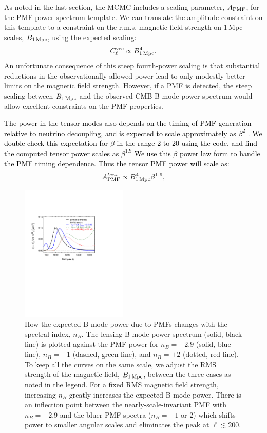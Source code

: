 \documentclass[apj]{emulateapj}
\newcommand{\apmf}{\ensuremath{A_{\rm PMF}}}
\newcommand{\bpmf}{\ensuremath{B_{\rm 1\,Mpc}}}
\newcommand{\be}{\begin{equation}}
\newcommand{\ee}{\end{equation}}
\newcommand{\changed}[1]{\textcolor{Black}{#1}}
\begin{document}
As noted in the last section, the MCMC includes a  scaling parameter, \apmf{}, for the PMF power spectrum template. 
We can translate the amplitude constraint on this template to a constraint on the r.m.s. magnetic field strength on 1\,Mpc scales, \bpmf, using the expected scaling:
\be \label{eqn:scaling}
C_{\ell}^{\rm{vec}} \propto \bpmf^4.
\ee
An unfortunate consequence of this steep fourth-power scaling is that substantial reductions in the observationally allowed power lead to only modestly better limits on the magnetic field strength. 
However, if a PMF is detected, the steep scaling between \bpmf{} and the observed CMB B-mode power spectrum would allow excellent constraints on the PMF properties.

\changed{The power in the tensor modes also depends on the timing of PMF generation relative to neutrino decoupling, and is expected to scale approximately as $\beta^2$ \citep{lewis04,shaw10b}.   
We double-check this expectation for $\beta$ in the range 2 to 20 using the  \citet{zucca16} code, and find the computed tensor power scales as $\beta^{1.9}$
We use this $\beta$ power law form to handle the PMF timing dependence. 
Thus the tensor PMF power will scale as:
\be \label{eqn:betascaling}
\apmf^{tens} \propto  \bpmf^4 \beta^{1.9},
\ee
}

\begin{figure}[htb]\centering
\includegraphics[width=0.45\textwidth,clip,trim={1.5cm 12.cm 5.5cm 4cm}]{pmf_templates_nb.pdf}
  \caption[CMB polarization from PMFs with different spectral indices]{ \label{fig:pmf-nb}
  How the expected B-mode power due to PMFs changes with the spectral index, $n_B$. 
  The lensing B-mode power spectrum (solid, black line) is plotted against the PMF power for $n_B=-2.9$ (solid, blue line), $n_B=-1$ (dashed, green line), and $n_B=+2$ (dotted, red line). 
  To keep all the curves on the same scale, we adjust the RMS strength of the magnetic field, \bpmf{}, between the three cases as noted in the legend. 
  For a fixed RMS magnetic field strength, increasing $n_B$ greatly increases the expected B-mode power. 
  There is an inflection point between the nearly-scale-invariant PMF with $n_B=-2.9$ and the bluer PMF spectra ($n_B=-1$ or 2) which shifts power to smaller angular scales and eliminates the peak at $\ell \lesssim 200$. 
  }
\end{figure}
 
\end{document}
